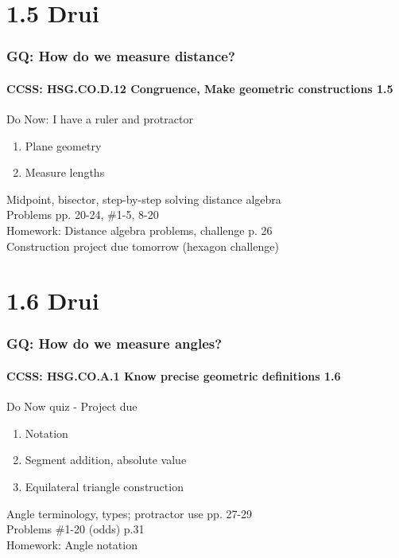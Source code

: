 \documentclass{beamer}
\begin{document}
\section{1.5 Drui}
  \frame
  {
    \frametitle{GQ: How do we measure distance?}
    \framesubtitle{CCSS: HSG.CO.D.12 Congruence, Make geometric constructions  \alert{1.5}}

    \begin{block}{Do Now: I have a ruler and protractor}
    \begin{enumerate}
        \item Plane geometry
        \item Measure lengths
    \end{enumerate}
    \end{block}
    Midpoint, bisector, step-by-step solving distance algebra\\
    Problems pp. 20-24, \#1-5, 8-20\\
    \vspace{0.5cm}
    Homework: Distance algebra problems, challenge p. 26\\
    Construction project due tomorrow (hexagon challenge)
  }

\section{1.6 Drui}
  \frame
  {
    \frametitle{GQ: How do we measure angles?}
    \framesubtitle{CCSS: HSG.CO.A.1 Know precise geometric definitions  \alert{1.6}}

    \begin{block}{Do Now quiz - \alert{Project due}}
    \begin{enumerate}
        \item Notation
        \item Segment addition, absolute value
        \item Equilateral triangle construction
    \end{enumerate}
    \end{block}
    Angle terminology, types; protractor use pp. 27-29\\
    Problems \#1-20 (odds) p.31\\
    \vspace{1cm}
    Homework: Angle notation
  }
\end{document}
